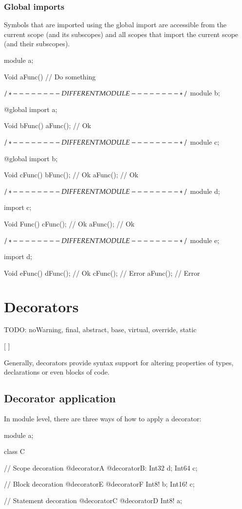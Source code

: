\subsection{Global imports} \label{decorator:global}
Symbols that are imported using the global import are accessible from the current scope (and its subscopes) and all scopes that import the current scope (and their subscopes).

\begin{code}
module a;

Void aFunc() {
	// Do something
}

$/* - - - - - - - - DIFFERENT MODULE - - - - - - - - */$
module b;

@global import a;

Void bFunc() {
	aFunc(); // Ok
}

$/* - - - - - - - - DIFFERENT MODULE - - - - - - - - */$
module c;

@global import b;

Void cFunc() {
	bFunc(); // Ok
	aFunc(); // Ok	
}

$/* - - - - - - - - DIFFERENT MODULE - - - - - - - - */$
module d;

import c;

Void Func() {
	cFunc(); // Ok
	aFunc(); // Ok
}

$/* - - - - - - - - DIFFERENT MODULE - - - - - - - - */$
module e;

import d;

Void eFunc() {
	dFunc(); // Ok
	cFunc(); // Error
	aFunc(); // Error	
}
\end{code}

\chapter{Decorators}
TODO: noWarning, final, abstract, base, virtual, override, static

\begin{grammar}
	   [  ]
\end{grammar}

Generally, decorators provide syntax support for altering properties of types, declarations or even blocks of code.

\section{Decorator application}
In module level, there are three ways of how to apply a decorator:
\begin{code}
module a;

class C {
	
// Scope decoration
@decoratorA @decoratorB:
	Int32 d;
	Int64 c;
	
	// Block decoration
	@decoratorE @decoratorF {
		Int8! b;
		Int16! c;	
	}
	
	// Statement decoration
	@decoratorC @decoratorD Int8! a;
				
}
\end{code}

